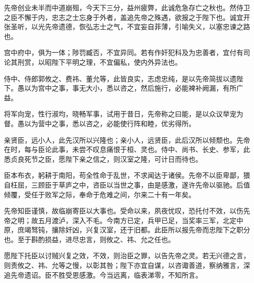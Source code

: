 
\begin{acknowledgements}

先帝创业未半而中道崩殂，今天下三分，益州疲弊，此诚危急存亡之秋也。然侍卫之臣不懈于内，忠志之士忘身于外者，盖追先帝之殊遇，欲报之于陛下也。诚宜开张圣听，以光先帝遗德，恢弘志士之气，不宜妄自菲薄，引喻失义，以塞忠谏之路也。


宫中府中，俱为一体；陟罚臧否，不宜异同。若有作奸犯科及为忠善者，宜付有司论其刑赏，以昭陛下平明之理，不宜偏私，使内外异法也。


侍中、侍郎郭攸之、费祎、董允等，此皆良实，志虑忠纯，是以先帝简拔以遗陛下。愚以为宫中之事，事无大小，悉以咨之，然后施行，必能裨补阙漏，有所广益。


将军向宠，性行淑均，晓畅军事，试用于昔日，先帝称之曰能，是以众议举宠为督。愚以为营中之事，悉以咨之，必能使行阵和睦，优劣得所。


亲贤臣，远小人，此先汉所以兴隆也；亲小人，远贤臣，此后汉所以倾颓也。先帝在时，每与臣论此事，未尝不叹息痛恨于桓、灵也。侍中、尚书、长史、参军，此悉贞良死节之臣，愿陛下亲之信之，则汉室之隆，可计日而待也。


臣本布衣，躬耕于南阳，苟全性命于乱世，不求闻达于诸侯。先帝不以臣卑鄙，猥自枉屈，三顾臣于草庐之中，咨臣以当世之事，由是感激，遂许先帝以驱驰。后值倾覆，受任于败军之际，奉命于危难之间，尔来二十有一年矣。


先帝知臣谨慎，故临崩寄臣以大事也。受命以来，夙夜忧叹，恐托付不效，以伤先帝之明；故五月渡泸，深入不毛。今南方已定，兵甲已足，当奖率三军，北定中原，庶竭驽钝，攘除奸凶，兴复汉室，还于旧都。此臣所以报先帝而忠陛下之职分也。至于斟酌损益，进尽忠言，则攸之、祎、允之任也。


愿陛下托臣以讨贼兴复之效，不效，则治臣之罪，以告先帝之灵。若无兴德之言，则责攸之、祎、允等之慢，以彰其咎；陛下亦宜自谋，以咨诹善道，察纳雅言，深追先帝遗诏。臣不胜受恩感激。今当远离，临表涕零，不知所言。

\end{acknowledgements}
